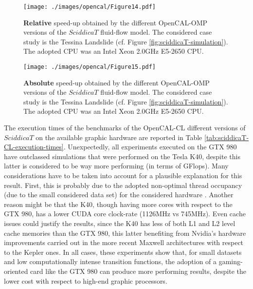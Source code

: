 \begin{figure}
	\begin{center}
		\texttt{[image: ./images/opencal/Figure14.pdf]}
		\caption[\textbf{Relative} speed-up obtained by the different OpenCAL-OMP versions of
		the $SciddicaT$ fluid-flow model.]{\textbf{Relative} speed-up obtained by the different OpenCAL-OMP versions of
			the $SciddicaT$ fluid-flow model. The considered case study is the
			Tessina Landslide (cf. Figure \ref{fig:sciddicaT-simulation}). The
			adopted CPU was an Intel Xeon 2.0GHz E5-2650 CPU.}
		\label{gr:sciddicaT-OMP-relative-speed-up}
	\end{center}
\end{figure}

\begin{figure}
	\begin{center}
		\texttt{[image: ./images/opencal/Figure15.pdf]}
		\caption[\textbf{Absolute} speed-up obtained by the different OpenCAL-OMP versions of
		the $SciddicaT$ fluid-flow model.]{\textbf{Absolute} speed-up obtained by the different OpenCAL-OMP versions of
			the $SciddicaT$ fluid-flow model. The considered case study is the
			Tessina Landslide (cf. Figure \ref{fig:sciddicaT-simulation}). The
			adopted CPU was an Intel Xeon 2.0GHz E5-2650 CPU.}
		\label{gr:sciddicaT-OMP-absolute-speed-up}
	\end{center}
\end{figure}

The execution times of the benchmarks of the OpenCAL-CL different
versions of $SciddicaT$ on the available graphic hardware are
reported in Table
\ref{tab:sciddicaT-CL-execution-times}. Unexpectedly, all
experiments executed on the GTX 980 have outclassed simulations
that were performed on the Tesla K40, despite this latter is
considered to be way more performing (in terms of GFlops). Many
considerations have to be taken into account for a plausible
explanation for this result. First, this is probably due to the
adopted non-optimal thread occupancy (due to the small considered
data set) for the considered hardware \cite{Kirk-2010}. Another
reason might be that the K40, though having more cores with
respect to the GTX 980, has a lower CUDA core clock-rate (1126MHz
vs 745MHz). Even cache issues could justify the results, since the
K40 has less of both L1 and L2 level cache memories than the GTX
980, this latter benefiting from Nvidia's hardware improvements
carried out in the more recent Maxwell architectures with respect
to the Kepler ones. In all cases, these experiments show that, for
small datasets and low computationally intense transition
functions, the adoption of a gaming-oriented card like the GTX 980
can produce more performing results, despite the lower cost with
respect to high-end graphic processors.


